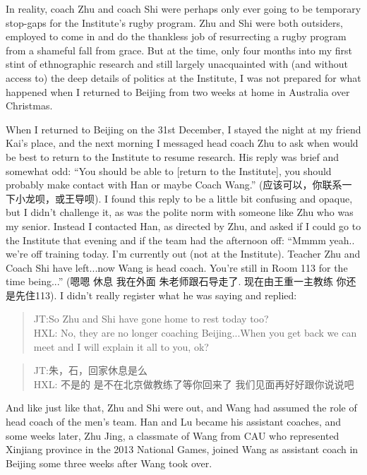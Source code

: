 \begin{CJK}{UTF8}{gbsn}
In reality, coach Zhu and coach Shi were perhaps only ever going to be temporary stop-gaps for the Institute's rugby program.  Zhu and Shi were both outsiders, employed to come in and do the thankless job of resurrecting a rugby program from a shameful fall from grace.  But at the time, only four months into my first stint of ethnographic research and still largely unacquainted with (and without access to) the deep details of politics at the Institute, I was not prepared for what happened when I returned to Beijing from two weeks at home in Australia over Christmas.

When I returned to Beijing on the 31st December, I stayed the night at my friend Kai's place, and the next morning I messaged head coach Zhu to ask when would be best to return to the Institute to resume research.  His reply was brief and somewhat odd: ``You should be able to [return to the Institute], you should probably make contact with Han or maybe Coach Wang.'' (应该可以，你联系一下小龙呗，或王导呗). I found this reply to be a little bit confusing and opaque, but I didn't challenge it, as was the polite norm with someone like Zhu who was my senior.  Instead I contacted Han, as directed by Zhu, and asked if I could go to the Institute that evening and if the team had the afternoon off: ``Mmmm yeah.. we're off training today. I'm currently out (not at the Institute). Teacher Zhu and Coach Shi have left...now Wang is head coach.  You're still in Room 113 for the time being...'' (嗯嗯 休息 我在外面 朱老师跟石导走了. 现在由王重一主教练 你还是先住113).  I didn't really register what he was saying and replied:

\begin{quote}
  JT:So Zhu and Shi have gone home to rest today too? \\
  HXL: No, they are no longer coaching Beijing...When you get back we can meet and I will explain it all to you, ok? \\
\end{quote}

\begin{quote}
  JT:朱，石，回家休息是么 \\
  HXL: 不是的 是不在北京做教练了等你回来了 我们见面再好好跟你说说吧
\end{quote}


And like just like that, Zhu and Shi were out, and Wang had assumed the role of head coach of the men's team.  Han and Lu became his assistant coaches, and some weeks later, Zhu Jing, a classmate of Wang from CAU who represented Xinjiang province in the 2013 National Games, joined Wang as assistant coach in Beijing some three weeks after Wang took over.


\end{CJK}
